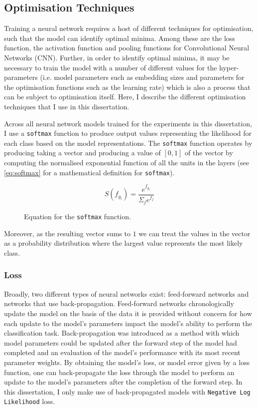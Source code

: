 \subsection{Optimisation Techniques}

Training a neural network requires a host of different techniques for optimisation, such that the model can identify optimal minima. Among these are the loss function, the activation function and pooling functions for Convolutional Neural Networks (CNN). Further, in order to identify optimal minima, it may be necessary to train the model with a number of different values for the hyper-parameters (i.e. model parameters such as embedding sizes and parameters for the optimisation functions such as the learning rate) which is also a process that can be subject to optimisation itself. Here, I describe the different optimisation techniques that I use in this dissertation.

Across all neural network models trained for the experiments in this dissertation, I use a \texttt{softmax} function to produce output values representing the likelihood for each class based on the model representations. The \texttt{softmax} function operates by producing taking a vector and producing a value of $[0,1]$ of the vector by computing the normalised exponential function of all the units in the layers (see \cref{eq:softmax} for a mathematical definition for \texttt{softmax}).

\begin{figure}[h]
  \begin{equation}\label{eq:softmax}
    S(f_{y_i}) = \dfrac{e^{f_{y_{i}}}}{\Sigma_j e^{f_j}}
  \end{equation}
  \caption{Equation for the \texttt{softmax} function.}
\end{figure}

Moreover, as the resulting vector sums to $1$ we can treat the values in the vector as a probability distribution where the largest value represents the most likely class.

\subsubsection{Loss}

Broadly, two different types of neural networks exist: feed-forward networks and networks that use back-propagation. Feed-forward networks chronologically update the model on the basis of the data it is provided without concern for how each update to the model's parameters impact the model's ability to perform the classification task. 
Back-propagation \citep{Backprop paper} was introduced as a method with which model parameters could be updated after the forward step of the model had completed and an evaluation of the model's performance with its most recent parameter weights.
By obtaining the model's loss, or model error given by a loss function, one can back-propagate the loss through the model to perform an update to the model's parameters after the completion of the forward step.
In this dissertation, I only make use of back-propagated models with \texttt{Negative Log Likelihood} loss.

